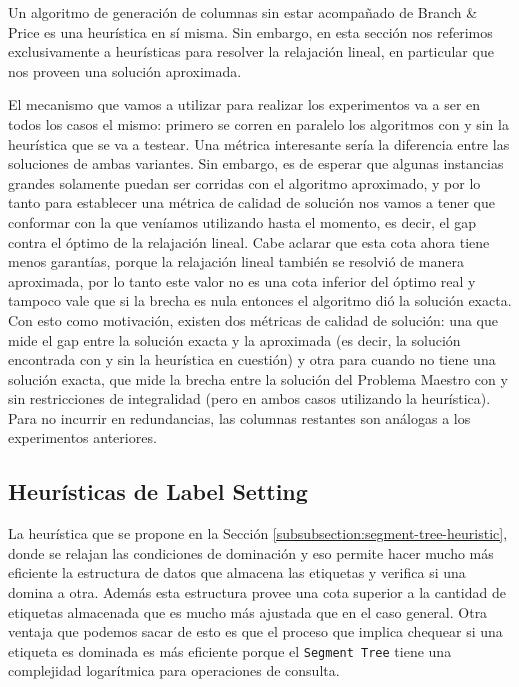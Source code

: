 Un algoritmo de generación de columnas sin estar acompañado de Branch \& Price es una heurística en sí misma. Sin embargo, en esta sección nos referimos exclusivamente a heurísticas para resolver la relajación lineal, en particular que nos proveen una solución aproximada. 

El mecanismo que vamos a utilizar para realizar los experimentos va a ser en todos los casos el mismo: primero se corren en paralelo los algoritmos con y sin la heurística que se va a testear. Una métrica interesante sería la diferencia entre las soluciones de ambas variantes. Sin embargo, es de esperar que algunas instancias grandes solamente puedan ser corridas con el algoritmo aproximado, y por lo tanto para establecer una métrica de calidad de solución nos vamos a tener que conformar con la que veníamos utilizando hasta el momento, es decir, el gap contra el óptimo de la relajación lineal. Cabe aclarar que esta cota ahora tiene menos garantías, porque la relajación lineal también se resolvió de manera aproximada, por lo tanto este valor no es una cota inferior del óptimo real y tampoco vale que si la brecha es nula entonces el algoritmo dió la solución exacta. Con esto como motivación, existen dos métricas de calidad de solución: una que mide el gap entre la solución exacta y la aproximada (es decir, la solución encontrada con y sin la heurística en cuestión) y otra para cuando no tiene una solución exacta, que mide la brecha entre la solución del Problema Maestro con y sin restricciones de integralidad (pero en ambos casos utilizando la heurística). Para no incurrir en redundancias, las columnas restantes son análogas a los experimentos anteriores.

\subsection{Heurísticas de Label Setting}
\label{section:experiments-label-setting-heur}

La heurística que se propone en la Sección \ref{subsubsection:segment-tree-heuristic}, donde se relajan las condiciones de dominación y eso permite hacer mucho más eficiente la estructura de datos que almacena las etiquetas y verifica si una domina a otra. Además esta estructura provee una cota superior a la cantidad de etiquetas almacenada que es mucho más ajustada que en el caso general. Otra ventaja que podemos sacar de esto es que el proceso que implica chequear si una etiqueta es dominada es más eficiente porque el \texttt{Segment Tree} tiene una complejidad logarítmica para operaciones de consulta. 

